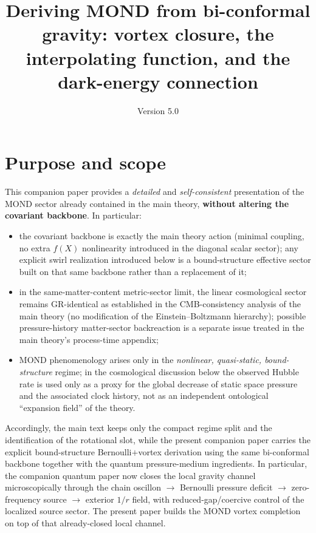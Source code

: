 \documentclass[11pt]{article}
\title{Deriving MOND from bi-conformal gravity: vortex closure, the interpolating function, and the dark-energy connection}
\author{}
\date{Version 5.0}
\begin{document}
\let\phi\varphi
\maketitle
\tableofcontents
\clearpage

{}
\section*{Purpose and scope}
This companion paper provides a \emph{detailed} and \emph{self-consistent} presentation of the MOND sector already contained in the main theory, \textbf{without altering the covariant backbone}. In particular:
\begin{itemize}
\item the covariant backbone is exactly the main theory action (minimal coupling, no extra $f(X)$ nonlinearity introduced in the diagonal scalar sector); any explicit swirl realization introduced below is a bound-structure effective sector built on that same backbone rather than a replacement of it;
\item in the same-matter-content metric-sector limit, the linear cosmological sector remains GR-identical as established in the CMB-consistency analysis of the main theory (no modification of the Einstein--Boltzmann hierarchy); possible pressure-history matter-sector backreaction is a separate issue treated in the main theory's process-time appendix;
\item MOND phenomenology arises only in the \emph{nonlinear, quasi-static, bound-structure} regime; in the cosmological discussion below the observed Hubble rate is used only as a proxy for the global decrease of static space pressure and the associated clock history, not as an independent ontological ``expansion field'' of the theory.
\end{itemize}
Accordingly, the main text keeps only the compact regime split and the identification of the rotational slot, while the present companion paper carries the explicit bound-structure Bernoulli$+$vortex derivation using the same bi-conformal backbone together with the quantum pressure-medium ingredients.  In particular, the companion quantum paper now closes the local gravity channel microscopically through the chain oscillon $\to$ Bernoulli pressure deficit $\to$ zero-frequency source $\to$ exterior $1/r$ field, with reduced-gap/coercive control of the localized source sector.  The present paper builds the MOND vortex completion on top of that already-closed local channel.
\end{document}

